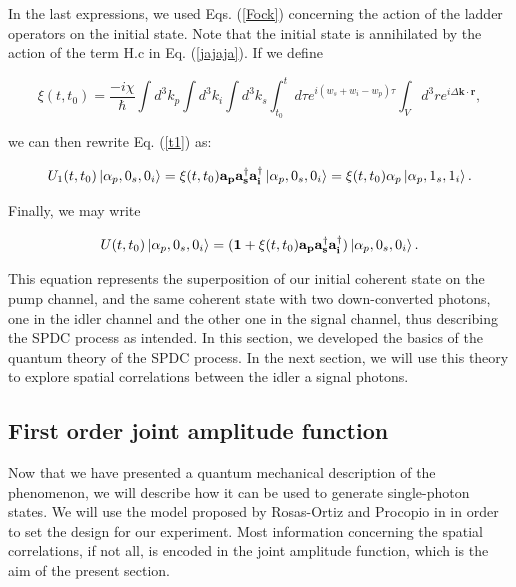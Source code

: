 \documentclass[12pt]{book}
\begin{document}
In the last expressions, we used Eqs. (\ref{Fock})  concerning the action of the ladder operators on the initial state. Note that the initial state is annihilated by the action of the term $\mathrm{H.c}$ in Eq. (\ref{jajaja}).  If we define 

\begin{equation}
 \xi(t,t_{0})=\frac{-i\chi}{\hbar}  \int d^{3}k_{p}\int d^{3}k_{i} \int d^{3}k_{s}    \int_{t_{0}}^{t} d\tau e^{i(w_{s}+w_{i}-w_{p})\tau}  
\int_{V} d^{3}r  e^{i \Delta\textbf{k} \cdot\textbf{r}} ,
\end{equation}



we can then rewrite Eq. (\ref{t1}) as:

\begin{equation}
U_{1}(t,t_{0})\ket{\alpha_{p},0_{s},0_{i}}=\xi(t,t_{0}) \mathbf{a_{p}}\mathbf{a_{s}^{\dagger}}\mathbf{a_{i}^{\dagger}}\ket{\alpha_{p},0_{s},0_{i}}=\xi(t,t_{0}) \alpha_{p} \ket{\alpha_{p},1_{s},1_{i}}.
\end{equation}

Finally, we may write

\begin{equation}
    U(t,t_{0})\ket{\alpha_{p},0_{s},0_{i}}=(\mathbf{1}+\xi(t,t_{0}) \mathbf{a_{p}}\mathbf{a_{s}^{\dagger}}\mathbf{a_{i}^{\dagger}})\ket{\alpha_{p},0_{s},0_{i}}. \label{evo}
\end{equation}

This equation represents the superposition of our initial coherent state on the pump channel, and the same coherent state with two down-converted photons, one in the idler channel and the other one in the signal channel, thus describing the SPDC process as intended. In this section, we developed the basics of the quantum theory of the SPDC process. In the next section, we will use this theory to explore spatial correlations between the idler a signal photons.

\subsection{First order joint amplitude function}

Now that we have presented a quantum mechanical description of the phenomenon, we will describe how it can be used to generate single-photon states. We will use the model proposed by  Rosas-Ortiz and  Procopio in \cite{procopio} in order to set the design for our experiment. Most information concerning the spatial correlations, if not all, is encoded in the joint amplitude function, which is the aim of the present section.
\end{document}
